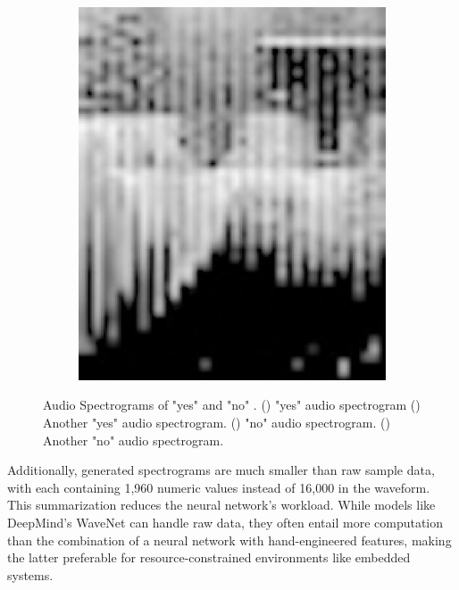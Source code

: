 \begin{figure}[h!]
\begin{subfigure}{0.45\textwidth}
		\includegraphics[width=\linewidth]{Images/DataMining/SpectrogramNoSecond.jpg}
		\caption{}    %
		\label{subfig:SpectrogramNoSecond}
	\end{subfigure}
	
	\caption{Audio Spectrograms of "yes" and "no" \cite{Warden:2019}. () "yes" audio spectrogram () Another "yes" audio spectrogram. () "no" audio spectrogram. () Another "no" audio spectrogram.}
	\label{fig:audioSpectrograms}
\end{figure}

Additionally, generated spectrograms are much smaller than raw sample data, with each containing 1,960 numeric values instead of 16,000 in the waveform. This summarization reduces the neural network's workload. While models like DeepMind's WaveNet \cite{Oord:2016} can handle raw data, they often entail more computation than the combination of a neural network with hand-engineered features, making the latter preferable for resource-constrained environments like embedded systems.

